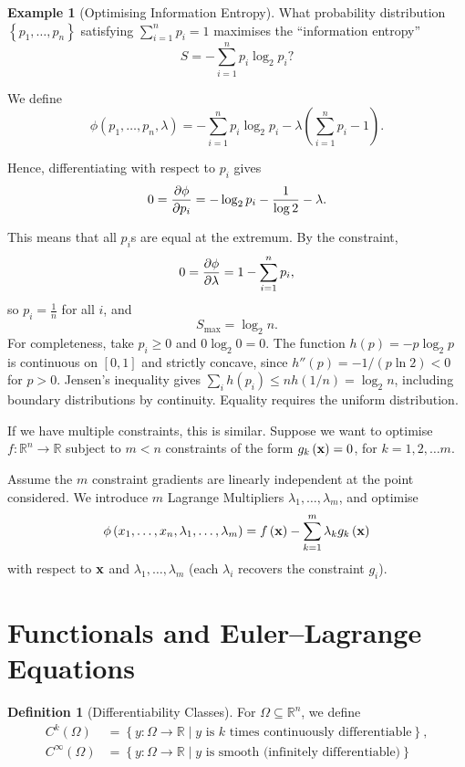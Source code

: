 \documentclass[11pt]{article}
\numberwithin{equation}{section}
\theoremstyle{definition}
\newtheorem{definition}[theorem]{Definition}
\newtheorem{example}[theorem]{Example}
\theoremstyle{remark}
\newcommand{\pqty}[1]{\left(#1\right)}
\newcommand{\Bqty}[1]{\left\{#1\right\}}
\newcommand{\flatfrac}[2]{\frac{#1}{#2}}
\newcommand{\set}[2]{\left\{#1\mid #2\right\}}
\newcommand{\functiondomain}[3]{#1:#2\to #3}
\newcommand{\RR}{\mathbb{R}}
\newcommand{\contClass}[1]{C^{#1}}
\newcommand{\smoothClass}{C^\infty}
\begin{document}
\begin{example}[Optimising Information Entropy]\label{variation-unit-0039}
    What probability distribution \(\Bqty{p_1, \ldots, p_n}\) satisfying \(\sum_{i = 1}^{n} p_i = 1\) maximises the ``information entropy''
    \[
        S = - \sum_{i = 1}^{n} p_i \log_2 p_i?
    \]

    We define
    \[
        \phi\pqty{p_1, \ldots, p_n, \lambda} = - \sum_{i = 1}^{n} p_i \log_2 p_i - \lambda \pqty{\sum_{i = 1}^{n} p_i - 1}.
    \]

    Hence, differentiating with respect to \(p_i\) gives
    \[
        0 = \pdv{\phi}{p_i} = - \log_2 p_i - \frac{1}{\log 2} - \lambda.
    \]

    This means that all \(p_i\)s are equal at the extremum. By the constraint,
    \[
        0 = \pdv{\phi}{\lambda} = 1-\sum_{i=1}^n p_i,
    \]
    so \(p_i = \flatfrac{1}{n}\) for all \(i\), and
    \[
        S_{\max} = \log_2 n.
    \]
For completeness, take \(p_i\ge0\) and \(0\log_2 0=0\). The function
\(h(p)=-p\log_2p\) is continuous on \([0,1]\) and strictly concave, since
\(h''(p)=-1/(p\ln2)<0\) for \(p>0\). Jensen's inequality gives
\(\sum_i h(p_i)\le n h(1/n)=\log_2 n\), including boundary distributions
by continuity. Equality requires the uniform distribution.
\end{example}

If we have multiple constraints, this is similar. Suppose we want to optimise \(\functiondomain{f}{\RR^n}{\RR}\) subject to \(m < n\) constraints of the form \(g_k \pqty{\vb{x}} = 0\), for \(k = 1, 2, \ldots m\).

Assume the \(m\) constraint gradients are linearly independent at the point considered. We introduce \(m\) Lagrange Multipliers \(\lambda_1, \ldots, \lambda_m\), and optimise
\[
    \phi\pqty{x_1, \ldots, x_n, \lambda_1, \ldots, \lambda_m} = f\pqty{\vb{x}} - \sum_{k = 1}^{m} \lambda_k g_k \pqty{\vb{x}}
\]
with respect to \(\vb{x}\) and \(\lambda_1, \ldots, \lambda_m\) (each \(\lambda_i\) recovers the constraint \(g_i\)).

\section{Functionals and Euler--Lagrange Equations}

\begin{definition}[Differentiability Classes]\label{variation-unit-0040}
    For \(\Omega \subseteq \RR^n\), we define
    \begin{align*}
        \contClass{k} \pqty{\Omega} &= \set{\functiondomain{y}{\Omega}{\RR}}{y \text{ is }k\text{ times continuously differentiable}}, \\
        \smoothClass \pqty{\Omega} &= \set{\functiondomain{y}{\Omega}{\RR}}{y \text{ is smooth (infinitely differentiable)}}
    \end{align*}
\end{definition}
\end{document}
